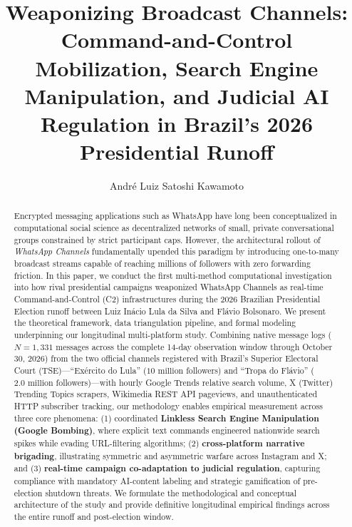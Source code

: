 \documentclass[preprint,12pt]{elsarticle}
\begin{document}
\begin{frontmatter}

\title{Weaponizing Broadcast Channels: Command-and-Control Mobilization, Search Engine Manipulation, and Judicial AI Regulation in Brazil's 2026 Presidential Runoff}

\author[inst1]{André Luiz Satoshi Kawamoto}


\begin{abstract}
Encrypted messaging applications such as WhatsApp have long been conceptualized in computational social science as decentralized networks of small, private conversational groups constrained by strict participant caps. However, the architectural rollout of \textit{WhatsApp Channels} fundamentally upended this paradigm by introducing one-to-many broadcast streams capable of reaching millions of followers with zero forwarding friction. In this paper, we conduct the first multi-method computational investigation into how rival presidential campaigns weaponized WhatsApp Channels as real-time Command-and-Control (C2) infrastructures during the 2026 Brazilian Presidential Election runoff between Luiz Inácio Lula da Silva and Flávio Bolsonaro. We present the theoretical framework, data triangulation pipeline, and formal modeling underpinning our longitudinal multi-platform study. Combining native message logs ($N=1,331$ messages across the complete 14-day observation window through October 30, 2026) from the two official channels registered with Brazil's Superior Electoral Court (TSE)---``Exército do Lula'' ($10\text{ million}$ followers) and ``Tropa do Flávio'' ($2.0\text{ million}$ followers)---with hourly Google Trends relative search volume, X (Twitter) Trending Topics scrapers, Wikimedia REST API pageviews, and unauthenticated HTTP subscriber tracking, our methodology enables empirical measurement across three core phenomena: (1) coordinated \textbf{Linkless Search Engine Manipulation (Google Bombing)}, where explicit text commands engineered nationwide search spikes while evading URL-filtering algorithms; (2) \textbf{cross-platform narrative brigading}, illustrating symmetric and asymmetric warfare across Instagram and X; and (3) \textbf{real-time campaign co-adaptation to judicial regulation}, capturing compliance with mandatory AI-content labeling and strategic gamification of pre-election shutdown threats. We formulate the methodological and conceptual architecture of the study and provide definitive longitudinal empirical findings across the entire runoff and post-election window.
\end{abstract}


\end{frontmatter}
\end{document}
